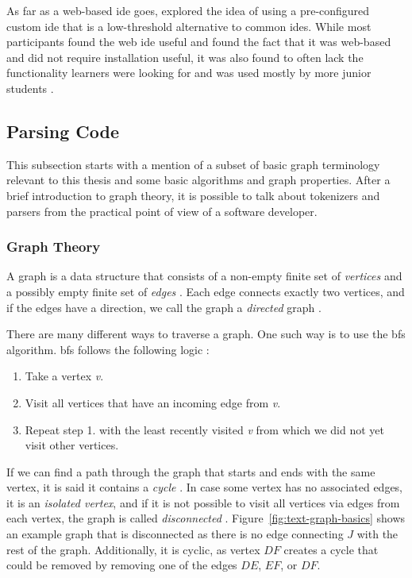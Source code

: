 As far as a web-based \gls{ide} goes, \textcite{valez_student_2020} explored the idea of using a pre-configured custom \gls{ide} that is a low-threshold alternative to common \glspl{ide}.
While most participants found the web \gls{ide} useful and found the fact that it was web-based and did not require installation useful, it was also found to often lack the functionality learners were looking for and was used mostly by more junior students \parencite{valez_student_2020}.

\subsection{Parsing Code}

This subsection starts with a mention of a subset of basic graph terminology relevant to this thesis and some basic algorithms and graph properties.
After a brief introduction to graph theory, it is possible to talk about tokenizers and parsers from the practical point of view of a software developer.

\subsubsection{Graph Theory}

A graph is a data structure that consists of a non-empty finite set of \emph{vertices} and a possibly empty finite set of \emph{edges} \parencite{wilson_graph_2009}.
Each edge connects exactly two vertices, and if the edges have a direction, we call the graph a \emph{directed} graph \parencite{wilson_graph_2009}.

There are many different ways to traverse a graph.
One such way is to use the \gls{bfs} algorithm.
\gls{bfs} follows the following logic \parencite{wilson_graph_2009}:

\begin{enumerate}
    \item Take a vertex \emph{v}.
    \item Visit all vertices that have an incoming edge from \emph{v}.
    \item Repeat step 1. with the least recently visited \emph{v} from which we did not yet visit other vertices.
\end{enumerate}

If we can find a path through the graph that starts and ends with the same vertex, it is said it contains a \emph{cycle} \parencite{wilson_graph_2009}.
In case some vertex has no associated edges, it is an \emph{isolated vertex}, and if it is not possible to visit all vertices via edges from each vertex, the graph is called \emph{disconnected} \parencite{wilson_graph_2009}.
Figure~\ref{fig:text-graph-basics} shows an example graph that is disconnected as there is no edge connecting $J$ with the rest of the graph.
Additionally, it is cyclic, as vertex $DF$ creates a cycle that could be removed by removing one of the edges $DE$, $EF$, or $DF$.

